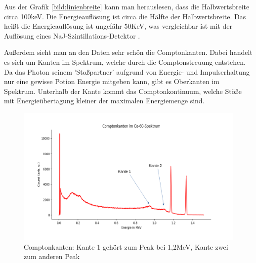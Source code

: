 Aus der Grafik \ref{bild:linienbreite} kann man herauslesen, dass die Halbwertsbreite circa 100keV. Die Energieauflösung ist circa die Hälfte der Halbwertsbreite. Das heißt 
die Energieauflösung ist ungefähr 50KeV, was vergleichbar ist mit der Auflösung eines NaJ-Szintillations-Detektor \cite[S.9]{Kador2021}. 

Außerdem sieht man an den Daten sehr schön die Comptonkanten. Dabei handelt es sich um Kanten im Spektrum, welche durch die Comptonstreuung entstehen. 
Da das Photon seinem 'Stoßpartner' aufgrund von Energie- und Impulserhaltung nur eine gewisse Potion Energie mitgeben kann, gibt es Oberkanten im 
Spektrum. Unterhalb der Kante kommt das Comptonkontinuum, welche Stöße mit Energieübertagung kleiner der maximalen Energiemenge sind.


\begin{figure}[ht]
    \centering
    \includegraphics[width = \linewidth]{Bilder/Auswertung/Comtonkante.png}
    \caption{Comptonkanten: Kante 1 gehört zum Peak bei 1,2MeV, Kante zwei zum anderen Peak}
\end{figure}

\clearpage

